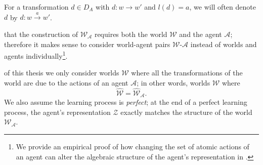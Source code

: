 
\begin{notation}
    For a transformation $d \in D_{A}$ with $d: w \to w'$ and $l(d) = a$, we will often denote $d$ by $d: w \xrightarrow{a} w'$.
\end{notation}

 that the construction of $\mathscr{W}_{\mathscr{A}}$ requires both the world $\mathscr{W}$ and the agent $\mathscr{A}$; therefore it makes sense to consider world-agent pairs $\mathscr{W}$-$\mathscr{A}$ instead of worlds and agents individually\footnote{
We provide an empirical proof of how changing the set of atomic actions of an agent can alter the algebraic structure of the agent's representation in .
}.

 of this thesis we only consider worlds $\mathscr{W}$ where all the transformations of the world are due to the actions of an agent $\mathscr{A}$; in other words, worlds $\mathscr{W}$ where
\begin{equation}
    \hat{\mathscr{W}} = \hat{\mathscr{W}}_{\mathscr{A}}.
\end{equation}
We also assume the learning process is \emph{perfect}; at the end of a perfect learning process, the agent's representation $\mathscr{Z}$ exactly matches the structure of the world $\mathscr{W}_{\mathscr{A}}$.


